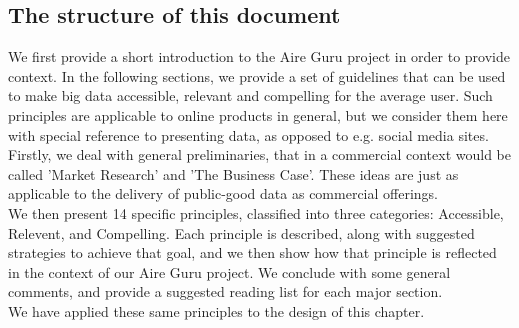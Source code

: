 \subsection{The structure of this document}

We first provide a short introduction to the Aire Guru project in order to provide context.
In the following sections, we provide a set of guidelines that can be used to make big data
accessible, relevant and compelling for the average user. Such principles are applicable to 
online products in general, but we consider them here with special reference to presenting
data, as opposed to e.g. social media sites. \\

Firstly, we deal with general preliminaries, that in a commercial context would be called
'Market Research' and 'The Business Case'. These ideas are just as applicable to the delivery of
public-good data as commercial offerings. \\

We then present 14 specific principles, classified into three categories: Accessible, Relevent, and Compelling.
Each principle is described, along with suggested strategies to achieve that goal, and we then show
how that principle is reflected in the context of our Aire Guru project. We conclude with some
general comments, and provide a suggested reading list for each major section. \\

We have applied these same principles to the design of this chapter.